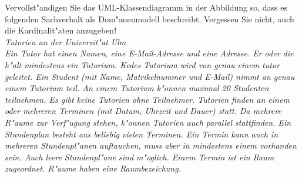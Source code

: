 \documentclass[12pt]{exam}
\begin{document}
\begin{questions}
\question[8] Vervollst"andigen Sie das UML-Klassendiagramm in der Abbildung so, dass es folgenden Sachverhalt als Dom"anenmodell beschreibt. Vergessen Sie nicht, auch die Kardinalit"aten anzugeben! \\
\emph{Tutorien an der Universit"at Ulm \\Ein Tutor hat einen Namen, eine E-Mail-Adresse und eine Adresse. Er oder die h"alt mindestens ein Tutorium. Kedes Tutorium wird von genau einem tutor geleitet. Ein Student (mit Name, Matrikelnummer und E-Mail) nimmt an genau einem Tutorium teil. An einem Tutorium k"onnen maximal 20 Studenten teilnehmen. Es gibt keine Tutorien ohne Teilnehmer. Tutorien finden an einem oder mehreren Terminen (mit Datum, Uhrzeit und Dauer) statt. Da mehrere R"aume zur Verf"ugung stehen, k"onnen Tutorien auch parallel stattfinden. Ein Stundenplan besteht aus beliebig vielen Terminen. Ein Termin kann auch in mehreren Stundenpl"anen auftauchen, muss aber in mindestens einem vorhanden sein. Auch leere Stundenpl"ane sind m"oglich. Einem Termin ist ein Raum zugeordnet. R"aume haben eine Raumbezeichung.}

\begin{comment}
{%
\renewcommand*\thechoice{\arabic{choice}} 
\renewcommand*\choicelabel{\thechoice)}
%
\question[2] Element with $Z=92$ is:
\begin{multicols}{2}
\begin{choices}
\choice H
\choice O
\choice F
\choice S
\choice Ba
\choice Pb
\choice U
\choice Pu
\end{choices}
\end{multicols}
}%

\question[10]
In no more than one paragraph, explain why the earth is round.
\makeemptybox{2in}

\question[20]
Explain blah, blah\ldots
\makeemptybox{\fill}

\newpage

\question[20]
Explain blah, blah\ldots
\fillwithlines{\fill}

\newpage

\question[20]
Explain blah, blah\ldots
\fillwithdottedlines{8em}
\end{comment}

\end{questions}
\end{document}
